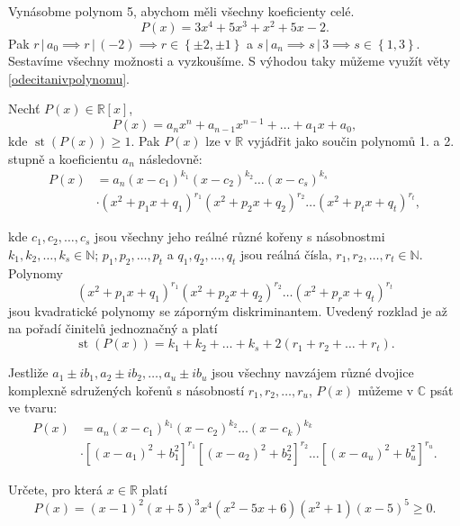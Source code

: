 \begin{reseni}
Vynásobme polynom 5, abychom měli všechny koeficienty celé.
$$P(x) = 3x^4+5x^3+x^2+5x-2.$$
Pak $r \, | \, a_0 \implies r\, | \, (-2) \implies r \in \left \{ \pm 2, \pm 1 \right \} $
a $s \, | \, a_n\implies s \, | \, 3 \implies s \in \left \{ 1, 3 \right \} $.
Sestavíme všechny možnosti a vyzkoušíme. S výhodou taky můžeme využít věty
\ref{odecitanivpolynomu}.
\end{reseni}


\begin{veta}
  Nechť $P(x) \in \mathbb R [x]$,
  $$P(x) = a_n x^n + a_{n-1} x^{n-1} + \dots + a_1 x + a_0,$$
  kde $\operatorname{st}(P(x)) \geq 1$. Pak $P(x)$ lze v $\mathbb R$ vyjádřit jako součin polynomů 1. a 2. stupně a koeficientu $a_n$ následovně:
  \begin{align*}
    P(x) & = a_n(x-c_1)^{k_1}(x-c_2)^{k_2} \dots (x-c_s)^{k_s}\\
    & \cdot (x^2+p_1 x + q_1)^{r_1}(x^2+p_2 x + q_2)^{r_2} \dots (x^2+p_t x + q_t)^{r_t},
  \end{align*}


  kde $c_1,c_2, \dots, c_s$ jsou všechny jeho reálné různé kořeny s násobnostmi $k_1, k_2, \dots, k_s \in \mathbb N$;
  $p_1, p_2, \dots, p_t$ a $q_1, q_2, \dots, q_t$ jsou reálná čísla, $r_1, r_2, \dots, r_t \in \mathbb N$.
  Polynomy
  $$(x^2+p_1 x + q_1)^{r_1}(x^2+p_2 x + q_2)^{r_2} \dots (x^2+p_r x + q_t)^{r_t}$$
  jsou kvadratické polynomy se záporným diskriminantem. Uvedený rozklad je až na pořadí činitelů
  jednoznačný a platí
  $$\operatorname{st}(P(x)) = k_1 + k_2 + \dots + k_s + 2(r_1 + r_2 + \dots + r_t).$$

  Jestliže $a_1 \pm ib_1, a_2 \pm ib_2, \dots, a_u \pm ib_u$ jsou všechny navzájem různé
  dvojice komplexně sdružených kořenů s násobností $r_1, r_2, \dots, r_u$, $P(x)$ můžeme v $\mathbb C$ psát ve tvaru:
  \begin{align*}
    P(x) & = a_n(x-c_1)^{k_1}(x-c_2)^{k_2} \dots (x-c_k)^{k_k}\\
    & \cdot  \left [(x-a_1)^2+b_1^2\right ]^{r_1}\left [(x-a_2)^2+b_2^2\right]^{r_2} \dots \left [(x-a_u)^2+b_u^2\right ]^{r_u}.
  \end{align*}
\end{veta}

\begin{priklad}
    Určete, pro která $x \in \mathbb R$ platí
    $$P(x)=(x-1)^2(x+5)^3x^4(x^2-5x+6)(x^2+1)(x-5)^5 \geq 0.$$
\end{priklad}

